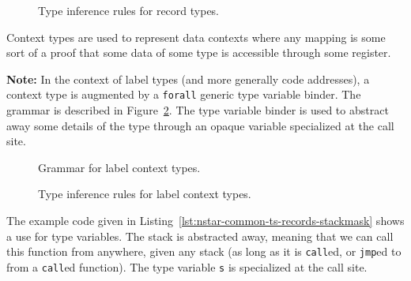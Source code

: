 \begin{figure}[htb]
  \centering


  \caption{Type inference rules for record types.}
  \label{fig:nstar-common-ts-records-typerules}
\end{figure}

Context types are used to represent data contexts where any mapping is some sort of a proof that some data of some type is accessible through some register.

\vspace{\baselineskip}

\textbf{Note:} In the context of label types (and more generally code addresses), a context type is augmented by a \texttt{forall} generic type variable binder.
The grammar is described in Figure~\ref{fig:nstar-common-ts-label-types-syntax}.
The type variable binder is used to abstract away some details of the type through an opaque variable specialized at the call site.

\begin{figure}[htb]
  \centering
  \caption{Grammar for label context types.}
  \label{fig:nstar-common-ts-label-types-syntax}
\end{figure}

\begin{figure}[htb]
  \centering


  \caption{Type inference rules for label context types.}
  \label{fig:nstar-common-ts-label-types-typerules}
\end{figure}

The example code given in Listing~\ref{lst:nstar-common-ts-records-stackmask} shows a use for type variables.
The stack is abstracted away, meaning that we can call this function from anywhere, given any stack (as long as it is \texttt{call}ed, or \texttt{jmp}ed to from a \texttt{call}ed function).
The type variable \texttt{s} is specialized at the call site.

